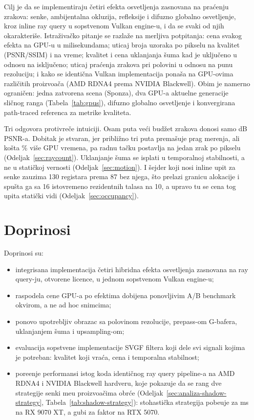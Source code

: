 Cilj je da se implementiraju \v{c}etiri efekta osvetljenja zasnovana na pra\'cenju zrakova: senke,
ambijentalna okluzija, refleksije i difuzno globalno osvetljenje, kroz inline ray query u sopstvenom Vulkan
engine-u, i da se svaki od njih okarakteri\v{s}e. Istra\v{z}iva\v{c}ko pitanje se razla\v{z}e na merljiva potpitanja:
cena svakog efekta na GPU-u u milisekundama; uticaj broja uzoraka po pikselu na kvalitet (PSNR/SSIM) i na
vreme; kvalitet i cena uklanjanja \v{s}uma kad je uklju\v{c}eno u odnosu na isklju\v{c}eno; uticaj pra\'cenja zrakova pri
polovini u odnosu na punu rezoluciju; i kako se identi\v{c}na Vulkan implementacija pona\v{s}a na GPU-ovima
razli\v{c}itih proizvo\dj{}a\v{c}a (AMD RDNA4 prema NVIDIA Blackwell). Obim je namerno ograni\v{c}en: jedna
zatvorena scena (Sponza), dva GPU-a aktuelne generacije sli\v{c}nog ranga (Tabela~\ref{tab:gpus}), difuzno
globalno osvetljenje i konvergirana path-traced referenca za metrike kvaliteta.

Tri odgovora protivre\v{c}e intuiciji. Osam puta ve\'ci bud\v{z}et zrakova donosi samo \rcPsnrGain{} dB PSNR-a.
Dobitak je stvaran, jer pribli\v{z}no tri puta prema\v{s}uje prag merenja, ali ko\v{s}ta \rcGpuPct\% vi\v{s}e GPU
vremena, pa radnu ta\v{c}ku postavlja na jedan zrak po pikselu (Odeljak~\ref{sec:raycount}). Uklanjanje
\v{s}uma se isplati u temporalnoj stabilnosti, a ne u stati\v{c}koj vernosti (Odeljak~\ref{sec:motion}). I
\v{s}ejder koji nosi inline upit za senke zauzima 130 registara prema 87 bez njega, \v{s}to prelazi granicu
alokacije i spu\v{s}ta ga sa 16 istovremeno rezidentnih talasa na 10, a upravo tu se cena tog upita
stati\v{c}ki vidi (Odeljak~\ref{sec:occupancy}).

\section{Doprinosi}

Doprinosi su:

\begin{itemize}
\item integrisana implementacija \v{c}etiri hibridna efekta osvetljenja zasnovana na ray query-ju, otvorene
licence, u jednom sopstvenom Vulkan engine-u;
\item raspodela cene GPU-a po efektima dobijena ponovljivim A/B benchmark okvirom, a ne ad hoc
snimcima;
\item ponovo upotrebljiv obrazac sa polovinom rezolucije, prepass-om G-bafera, uklanjanjem \v{s}uma i
upsampling-om;
\item evaluacija sopstvene implementacije SVGF filtera koji dele svi signali kojima je potreban: kvalitet
koji vra\'ca, cena i temporalna stabilnost;
\item pore\dj{}enje performansi istog koda identi\v{c}nog ray query pipeline-a na AMD RDNA4 i NVIDIA Blackwell
hardveru, koje pokazuje da se rang dve strategije senki me\dj{}u proizvo\dj{}a\v{c}ima obr\'ce
(Odeljak~\ref{sec:analiza-shadow-strategy}, Tabela~\ref{tab:shadow-strategy}): stohasti\v{c}ka strategija
pobe\dj{}uje za \perfShadowGapAMD{} ms na RX 9070 XT, a gubi za faktor \perfShadowRatioNV{} na RTX 5070.
\end{itemize}

